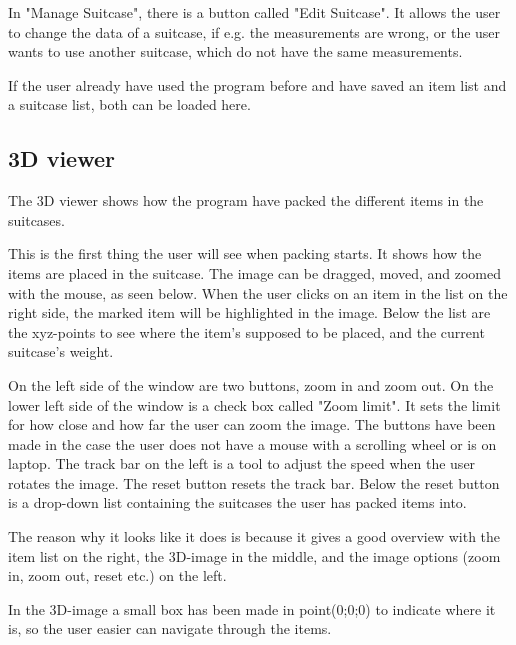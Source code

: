 In "Manage Suitcase", there is a button called "Edit Suitcase". It allows the user to change the data of a suitcase, if e.g. the measurements are wrong, or the user wants to use another suitcase, which do not have the same measurements.

If the user already have used the program before and have saved an item list and a suitcase list, both can be loaded here.

\subsection{3D viewer}
The 3D viewer shows how the program have packed the different items in the suitcases.


This is the first thing the user will see when packing starts. It shows how the items are placed in the suitcase.
The image can be dragged, moved, and zoomed with the mouse, as seen below. When the user clicks on an item in the list on the right side, the marked item will be highlighted in the image. Below the list are the xyz-points to see where the item's supposed to be placed, and the current suitcase's weight. 


On the left side of the window are two buttons, zoom in and zoom out. On the lower left side of the window is a check box called "Zoom limit". It sets the limit for how close and how far the user can zoom the image. The buttons have been made in the case the user does not have a mouse with a scrolling wheel or is on laptop. The track bar on the left is a tool to adjust the speed when the user rotates the image. The reset button resets the track bar. Below the reset button is a drop-down list containing the suitcases the user has packed items into.

The reason why it looks like it does is because it gives a good overview with the item list on the right, the 3D-image in the middle, and the image options (zoom in, zoom out, reset etc.) on the left.

In the 3D-image a small box has been made in point(0;0;0) to indicate where it is, so the user easier can navigate through the items.